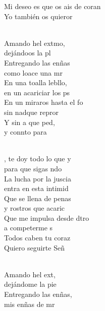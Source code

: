 \documentclass[12pt]{article}
\begin{document}
\begin{multicols*}{2}
\begin{cancion}
	Mi deseo es que os ais de coran \\
	Yo también os quieror\\\jump\\
	\begin{chorus}%
	Amando hel extmo, \\
	dejándoos la pl\\
	Entregando las enñas \\
	como loace una mr\\
	En una toalla lebllo, \\
	en un acariciar los ps\\
	En un miraros hasta el fo \\
	sin nadque repror\\
	Y sin a que ped, \\
	y connto para \\
	\end{chorus}%
	\jump\\
	, te doy todo lo que y \\
	para que sigas ndo\\
	La lucha por la juscia \\
	entra en esta intimid\\
	Que se llena de penas \\
	y rostros que acaric\\
	Que me impulsa desde dtro \\
	a competerme s\\
	Todos caben  tu coraz\\
	Quiero seguirte Señ\\\jump\\
	\begin{chorus}%
	Amando hel ext, \\
	dejándome la pie\\
	Entregando las enñas, \\
	mis enñas de mr\\

\end{chorus}
\end{cancion}
\end{multicols*}
\end{document}
